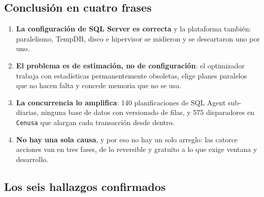 \documentclass[11pt,a4paper]{article}
\newcommand{\cod}[1]{\texttt{\small #1}}
\begin{document}
\subsection*{Conclusión en cuatro frases}

\begin{enumerate}[leftmargin=1.4em]\itemsep3pt
  \item \textbf{La configuración de SQL Server es correcta} y la plataforma
        también: paralelismo, TempDB, disco e hipervisor se midieron y se
        descartaron uno por uno.
  \item \textbf{El problema es de estimación, no de configuración}: el
        optimizador trabaja con estadísticas permanentemente obsoletas, elige
        planes paralelos que no hacen falta y concede memoria que no se usa.
  \item \textbf{La concurrencia lo amplifica}: 140 planificaciones de SQL
        Agent sub-diarias, ninguna base de datos con versionado de filas, y
        575 disparadores en \cod{Cenusa} que alargan cada transacción desde
        dentro.
  \item \textbf{No hay una sola causa}, y por eso no hay un solo arreglo: las
        catorce acciones van en tres fases, de lo reversible y gratuito a lo
        que exige ventana y desarrollo.
\end{enumerate}

\subsection*{Los seis hallazgos confirmados}
\end{document}
